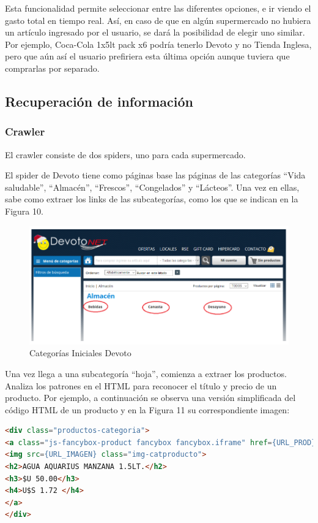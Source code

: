\documentclass[12pt]{article} %
\begin{document}
Esta funcionalidad permite seleccionar entre las diferentes opciones, e ir viendo el gasto total en tiempo real. Así, en caso de que en algún supermercado no hubiera un artículo ingresado por el usuario, se dará la posibilidad de elegir uno similar. Por ejemplo, Coca-Cola 1x5lt pack x6 podría tenerlo Devoto y no Tienda Inglesa, pero que aún así el usuario prefiriera esta última opción aunque tuviera que comprarlas por separado.


\subsection{Recuperación de información}

\subsubsection{Crawler}

El crawler consiste de dos spiders, uno para cada supermercado.

El spider de Devoto \cite{Devoto} tiene como páginas base las páginas de las categorías “Vida saludable”, “Almacén”, “Frescos”, “Congelados” y “Lácteos”. Una vez en ellas, sabe como extraer los links de las subcategorías, como los que se indican en la Figura 10.

\begin{figure}[H]
\includegraphics[height=0.30\textwidth]{pag_devoto}
\centering
\caption{Categorías Iniciales Devoto}
\end{figure}


Una vez llega a una subcategoría “hoja”, comienza a extraer los productos. Analiza los patrones en el HTML para reconocer el título y precio de un producto. Por ejemplo, a continuación se observa una versión simplificada del código HTML de un producto y en la Figura 11 su correspondiente imagen:


\begin{lstlisting}[language=HTML]
<div class="productos-categoria">
<a class="js-fancybox-product fancybox fancybox.iframe" href={URL_PROD}>
<img src={URL_IMAGEN} class="img-catproducto">
<h2>AGUA AQUARIUS MANZANA 1.5LT.</h2>
<h3>$U 50.00</h3>
<h4>U$S 1.72 </h4>
</a>
</div>
\end{lstlisting}
\end{document}
